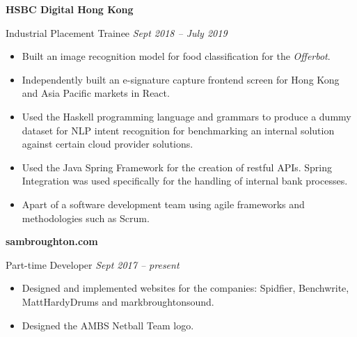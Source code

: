 \documentclass[10pt]{article} %
\begin{document}
\begin{changemargin}{0pt}{0.5pt}
\begin{minipage}[t]{0.5\textwidth}
\begin{changemargin}{5pt}{5pt}

\vspace{5pt}
\textbf{HSBC Digital Hong Kong}\\
\par
 Industrial Placement Trainee \textit{\hfill Sept 2018 -- July 2019} \\
\vspace{-5pt}

\begin{itemize} \itemsep-2pt %
  \item Built an image recognition model for food classification for the \textit{Offerbot}.
  \item Independently built an e-signature capture frontend screen for Hong Kong and Asia Pacific markets in React.
  \item Used the Haskell programming language and grammars to produce a dummy dataset for NLP intent recognition for benchmarking an internal solution against certain cloud provider solutions.
  \item Used the Java Spring Framework for the creation of restful APIs. Spring Integration was used specifically for the handling of internal bank processes.
  \item Apart of a software development team using agile frameworks and methodologies such as Scrum.
\end{itemize}


\vspace{5pt}
\textbf{sambroughton.com}\\
\par
\vspace{-10pt}
Part-time Developer \textit{\hfill Sept 2017 -- present}\\
\vspace{-5pt}

\begin{itemize} \itemsep-2pt %
  \item Designed and implemented websites for the companies: Spidfier, Benchwrite, MattHardyDrums and markbroughtonsound. 
  \item Designed the AMBS Netball Team logo.
  
\end{itemize}


\end{changemargin}
\end{minipage}
\end{changemargin}
\end{document}
